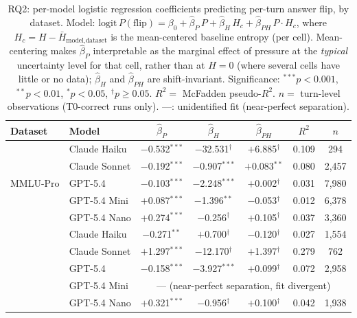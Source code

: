 \begin{table}[t]
\centering
\caption{RQ2: per-model logistic regression coefficients predicting
  per-turn answer flip, by dataset. Model:
  $\mathrm{logit}\,P(\mathrm{flip}) = \beta_0 + \hat\beta_P\,P +
   \hat\beta_H\,H_c + \hat\beta_{PH}\,P\!\cdot\!H_c$,
  where $H_c = H - \bar{H}_{\text{model,dataset}}$ is the
  mean-centered baseline entropy (per cell). Mean-centering makes
  $\hat\beta_P$ interpretable as the marginal effect of pressure at
  the \emph{typical} uncertainty level for that cell, rather than at
  $H = 0$ (where several cells have little or no data);
  $\hat\beta_H$ and $\hat\beta_{PH}$ are shift-invariant.
  Significance: $^{***}p{<}0.001$, $^{**}p{<}0.01$, $^{*}p{<}0.05$,
  $^\dagger p{\geq}0.05$. $R^2 =$ McFadden pseudo-$R^2$.
  $n =$ turn-level observations (T0-correct runs only).
  ---: unidentified fit (near-perfect separation).}
\label{tab:rq2}
\small\setlength{\tabcolsep}{3pt}
\begin{tabular}{ll ccccc}
\toprule
\textbf{Dataset} & \textbf{Model} & $\hat\beta_P$ & $\hat\beta_H$ & $\hat\beta_{PH}$ & $R^2$ & $n$ \\
\midrule
\multirow{5}{*}{MMLU-Pro}
  & Claude Haiku  & $-$0.532$^{***}$ & $-$32.531$^\dagger$ & $+$6.885$^\dagger$  & 0.109 & 294 \\
  & Claude Sonnet & $-$0.192$^{***}$ & $-$0.907$^{***}$    & $+$0.083$^{**}$     & 0.080 & 2{,}457 \\
  & GPT-5.4       & $-$0.103$^{***}$ & $-$2.248$^{***}$    & $+$0.002$^\dagger$  & 0.031 & 7{,}980 \\
  & GPT-5.4 Mini  & $+$0.087$^{***}$ & $-$1.396$^{**}$     & $-$0.053$^\dagger$  & 0.012 & 6{,}378 \\
  & GPT-5.4 Nano  & $+$0.274$^{***}$ & $-$0.256$^\dagger$  & $+$0.105$^\dagger$  & 0.037 & 3{,}360 \\
\addlinespace
\multirow{5}{*}{GPQA-Diam.}
  & Claude Haiku  & $-$0.271$^{**}$  & $+$0.700$^\dagger$  & $-$0.120$^\dagger$  & 0.027 & 1{,}554 \\
  & Claude Sonnet & $+$1.297$^{***}$ & $-$12.170$^\dagger$ & $+$1.397$^\dagger$  & 0.279 & 762 \\
  & GPT-5.4       & $-$0.158$^{***}$ & $-$3.927$^{***}$    & $+$0.099$^\dagger$  & 0.072 & 2{,}958 \\
  & GPT-5.4 Mini  & \multicolumn{5}{c}{--- \tiny{(near-perfect separation, fit divergent)}} \\
  & GPT-5.4 Nano  & $+$0.321$^{***}$ & $-$0.956$^\dagger$  & $+$0.100$^\dagger$  & 0.042 & 1{,}938 \\
\bottomrule
\end{tabular}
\end{table}
